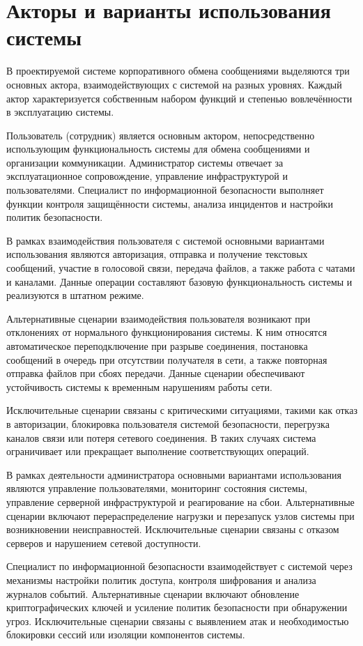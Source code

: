 \documentclass[14pt,a4paper]{extarticle}
\begin{document}
\section{Акторы и варианты использования системы}

В проектируемой системе корпоративного обмена сообщениями выделяются три основных актора, взаимодействующих с системой на разных уровнях. Каждый актор характеризуется собственным набором функций и степенью вовлечённости в эксплуатацию системы.

Пользователь (сотрудник) является основным актором, непосредственно использующим функциональность системы для обмена сообщениями и организации коммуникации. Администратор системы отвечает за эксплуатационное сопровождение, управление инфраструктурой и пользователями. Специалист по информационной безопасности выполняет функции контроля защищённости системы, анализа инцидентов и настройки политик безопасности.

В рамках взаимодействия пользователя с системой основными вариантами использования являются авторизация, отправка и получение текстовых сообщений, участие в голосовой связи, передача файлов, а также работа с чатами и каналами. Данные операции составляют базовую функциональность системы и реализуются в штатном режиме.

Альтернативные сценарии взаимодействия пользователя возникают при отклонениях от нормального функционирования системы. К ним относятся автоматическое переподключение при разрыве соединения, постановка сообщений в очередь при отсутствии получателя в сети, а также повторная отправка файлов при сбоях передачи. Данные сценарии обеспечивают устойчивость системы к временным нарушениям работы сети.

Исключительные сценарии связаны с критическими ситуациями, такими как отказ в авторизации, блокировка пользователя системой безопасности, перегрузка каналов связи или потеря сетевого соединения. В таких случаях система ограничивает или прекращает выполнение соответствующих операций.

В рамках деятельности администратора основными вариантами использования являются управление пользователями, мониторинг состояния системы, управление серверной инфраструктурой и реагирование на сбои. Альтернативные сценарии включают перераспределение нагрузки и перезапуск узлов системы при возникновении неисправностей. Исключительные сценарии связаны с отказом серверов и нарушением сетевой доступности.

Специалист по информационной безопасности взаимодействует с системой через механизмы настройки политик доступа, контроля шифрования и анализа журналов событий. Альтернативные сценарии включают обновление криптографических ключей и усиление политик безопасности при обнаружении угроз. Исключительные сценарии связаны с выявлением атак и необходимостью блокировки сессий или изоляции компонентов системы.
\end{document}
